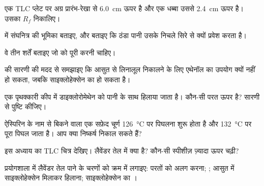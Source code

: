 \begin{exercise}[$\star$]\label{exo:g10:chemical-species:3}
एक TLC प्लेट पर  अग्र प्रारंभ-रेखा से \qty{6.0}{cm} ऊपर है
और एक धब्बा उससे \qty{2.4}{cm} ऊपर है। उसका $R_f$ निकालिए।
\end{exercise}

\begin{exercise}[$\star$]\label{exo:g10:chemical-species:4}
 में संघनित्र की भूमिका बताइए, और बताइए कि ठंडा पानी उसके निचले सिरे से
क्यों प्रवेश करता है।
\end{exercise}

\begin{exercise}[$\star$]\label{exo:g10:chemical-species:5}
वे तीन शर्तें बताइए जो   को पूरी करनी चाहिए।
\end{exercise}

\begin{exercise}[$\star\star$]\label{exo:g10:chemical-species:6}
 की सारणी की मदद से समझाइए कि आसुत से लिनालूल निकालने के लिए एथेनॉल
का उपयोग क्यों नहीं हो सकता, जबकि साइक्लोहेक्सेन का हो सकता है।
\end{exercise}

\begin{exercise}[$\star\star$]\label{exo:g10:chemical-species:7}
एक पृथक्कारी कीप में डाइक्लोरोमेथेन को पानी के साथ हिलाया जाता है। कौन-सी परत
ऊपर है? सारणी से पुष्टि कीजिए।
\end{exercise}

\begin{exercise}[$\star\star$]\label{exo:g10:chemical-species:8}
ऐस्पिरिन के नाम से बिकने वाला एक सफ़ेद चूर्ण \qty{126}{\celsius} पर पिघलना
शुरू होता है और \qty{132}{\celsius} पर पूरा पिघल जाता है। आप क्या निष्कर्ष निकाल सकते हैं?
\end{exercise}

\begin{exercise}[$\star\star$]\label{exo:g10:chemical-species:9}
इस अध्याय का TLC चित्र देखिए। लैवेंडर तेल में क्या है? कौन-सी
स्पीशीज़ ज़्यादा ऊपर चढ़ी?
\end{exercise}

\begin{exercise}[$\star\star$]\label{exo:g10:chemical-species:10}
प्रयोगशाला में लैवेंडर तेल पाने के चरणों को क्रम में लगाइए:
परतों को अलग करना; ; आसुत में साइक्लोहेक्सेन मिलाकर
हिलाना; साइक्लोहेक्सेन का ।
\end{exercise}

